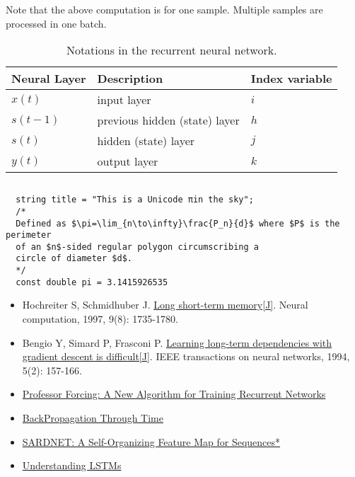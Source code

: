 \documentclass[UTF8,10pt,a4paper]{ctexbook}
\begin{document}
Note that the above computation is for one sample. Multiple samples are processed in one batch.

\begin{table}[H]
\centering
\begin{tabular}{|l|l|l|}
\hline
Neural Layer & Description & Index variable\\
\hline
$x(t)$ & input layer & $i$ \\
$s(t-1)$ & previous hidden (state) layer & $h$ \\
$s(t)$ & hidden (state) layer & $j$ \\
$y(t)$ & output layer & $k$ \\
\hline
\end{tabular}%
\caption{Notations in the recurrent neural network.}
\label{tab:rnn-notations}
\end{table}

\inputminted{python}{reference/code/bptt.py}

\begin{verbatim}
  string title = "This is a Unicode πin the sky";
  /*  
  Defined as $\pi=\lim_{n\to\infty}\frac{P_n}{d}$ where $P$ is the perimeter
  of an $n$-sided regular polygon circumscribing a
  circle of diameter $d$.
  */  
  const double pi = 3.1415926535
\end{verbatim}


\begin{itemize}
\item Hochreiter S, Schmidhuber J. \href{http://web.eecs.utk.edu/~itamar/courses/ECE-692/Bobby_paper1.pdf}{Long short-term memory[J]}. Neural computation, 1997, 9(8): 1735-1780.
\item Bengio Y, Simard P, Frasconi P. \href{http://www-dsi.ing.unifi.it/~paolo/ps/tnn-94-gradient.pdf}{Learning long-term dependencies with gradient descent is difficult[J]}. IEEE transactions on neural networks, 1994, 5(2): 157-166.
\item \href{https://arxiv.org/pdf/1610.09038.pdf}{Professor Forcing: A New Algorithm for Training Recurrent Networks}
\item \href{http://ir.hit.edu.cn/~jguo/docs/notes/bptt.pdf}{BackPropagation Through Time}
\item \href{http://nn.cs.utexas.edu/downloads/papers/james.sardnet.pdf}{SARDNET: A Self-Organizing Feature Map for Sequences*}
\item \href{http://colah.github.io/posts/2015-08-Understanding-LSTMs/}{Understanding LSTMs}
\end{itemize}
\end{document}
